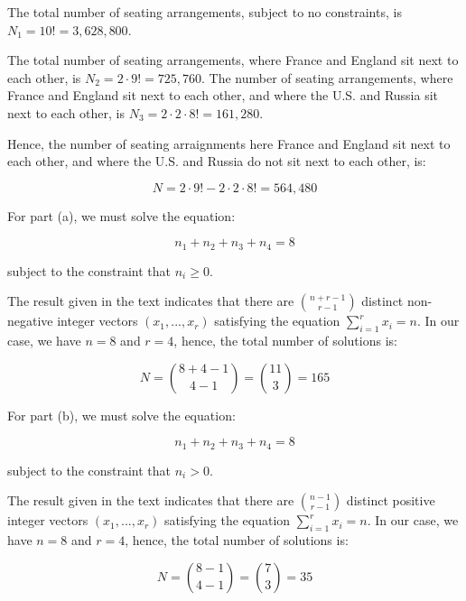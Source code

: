 \documentclass[a4paper,12pt]{article}
\begin{document}
The total number of seating arrangements, subject to no constraints, is $N_1 = 10! = 3,628,800$.

The total number of seating arrangements, where France and England sit next to each other, is $N_2 = 2 \cdot 9! = 725,760$. The number of seating arrangements, where France and England sit next to each other, and where the U.S. and Russia sit next to each other, is $N_3 = 2 \cdot 2 \cdot 8! = 161,280$. 

Hence, the number of seating arraignments here France and England sit next to each other, and where the U.S. and Russia do not sit next to each other, is:

\[ N = 2 \cdot 9! - 2 \cdot 2 \cdot 8! = 564,480 \]

\vspace{4mm}

For part (a), we must solve the equation:

\[ n_1 + n_2 + n_3 + n_4 = 8\]

\noindent 
subject to the constraint that $n_i \ge 0$. 

The result given in the text indicates that there are $\binom{n+r-1}{r-1}$ distinct non-negative integer vectors $(x_1,...,x_r)$ satisfying the equation $\sum_{i=1}^r x_i = n$. In our case, we have $n=8$ and $r=4$, hence, the total number of solutions is:

\[ N = \binom{8+4-1}{4-1} = \binom{11}{3} = 165 \]

\vspace{2mm}
For part (b), we must solve the equation:

\[ n_1 + n_2 + n_3 + n_4 = 8\]

\noindent
subject to the constraint that $n_i > 0$.

The result given in the text indicates that there are $\binom{n-1}{r-1}$ distinct positive integer vectors $(x_1,...,x_r)$ satisfying the equation $\sum_{i=1}^r x_i = n$. In our case, we have $n=8$ and $r=4$, hence, the total number of solutions is:

\[ N = \binom{8-1}{4-1} = \binom{7}{3} = 35 \]
\end{document}
